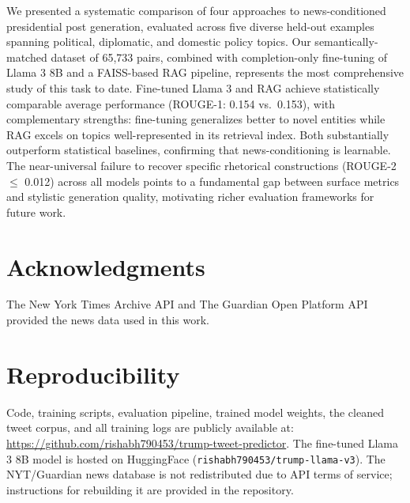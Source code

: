 \documentclass[11pt,a4paper]{article}
\begin{document}
We presented a systematic comparison of four approaches to news-conditioned presidential post generation, evaluated across five diverse held-out examples spanning political, diplomatic, and domestic policy topics. Our semantically-matched dataset of 65,733 pairs, combined with completion-only fine-tuning of Llama 3 8B and a FAISS-based RAG pipeline, represents the most comprehensive study of this task to date. Fine-tuned Llama 3 and RAG achieve statistically comparable average performance (ROUGE-1: 0.154 vs.\ 0.153), with complementary strengths: fine-tuning generalizes better to novel entities while RAG excels on topics well-represented in its retrieval index. Both substantially outperform statistical baselines, confirming that news-conditioning is learnable. The near-universal failure to recover specific rhetorical constructions (ROUGE-2 $\leq$ 0.012) across all models points to a fundamental gap between surface metrics and stylistic generation quality, motivating richer evaluation frameworks for future work.

\section*{Acknowledgments}

The New York Times Archive API and The Guardian Open Platform API provided the news data used in this work.

\section*{Reproducibility}

Code, training scripts, evaluation pipeline, trained model weights, the cleaned tweet corpus, and all training logs are publicly available at: \url{https://github.com/rishabh790453/trump-tweet-predictor}. The fine-tuned Llama 3 8B model is hosted on HuggingFace (\texttt{rishabh790453/trump-llama-v3}). The NYT/Guardian news database is not redistributed due to API terms of service; instructions for rebuilding it are provided in the repository.
\end{document}
